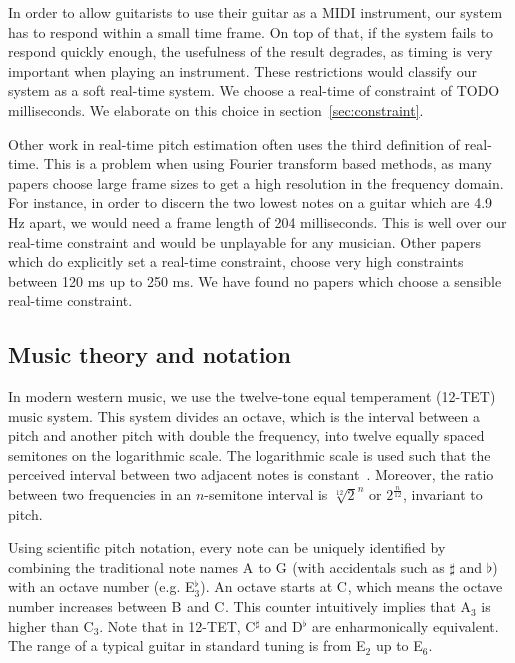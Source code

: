 \documentclass[10pt,twocolumn]{article}
\newcommand{\note}[2]{#1${}_{#2}$}
\newcommand{\notesharp}[2]{#1${}_{#2}^{\sharp}$}
\newcommand{\noteflat}[2]{#1${}_{#2}^{\flat}$}
\begin{document}
In order to allow guitarists to use their guitar as a MIDI instrument, our system has to respond within a small time frame. On top of that, if the system fails to respond quickly enough, the usefulness of the result degrades, as timing is very important when playing an instrument. These restrictions would classify our system as a soft real-time system. We choose a real-time of constraint of TODO milliseconds. We elaborate on this choice in section~\ref{sec:constraint}.

Other work in real-time pitch estimation often uses the third definition of real-time. This is a problem when using Fourier transform based methods, as many papers choose large frame sizes to get a high resolution in the frequency domain. For instance, in order to discern the two lowest notes on a guitar which are 4.9 Hz apart, we would need a frame length of 204 milliseconds. This is well over our real-time constraint and would be unplayable for any musician. Other papers which do explicitly set a real-time constraint, choose very high constraints between 120 ms up to 250 ms. We have found no papers which choose a sensible real-time constraint.

\subsection{Music theory and notation}
In modern western music, we use the twelve-tone equal temperament (12-TET) music system. This system divides an octave, which is the interval between a pitch and another pitch with double the frequency, into twelve equally spaced semitones on the logarithmic scale. The logarithmic scale is used such that the perceived interval between two adjacent notes is constant~\cite{perception}. Moreover, the ratio between two frequencies in an $n$-semitone interval is $\sqrt[12]{2}^n$ or $2^{\frac{n}{12}}$, invariant to pitch.

Using scientific pitch notation, every note can be uniquely identified by combining the traditional note names \note{A}{} to \note{G}{} (with accidentals such as $\sharp$ and $\flat$) with an octave number (e.g. \noteflat{E}{3}). An octave starts at \note{C}{}, which means the octave number increases between \note{B}{} and \note{C}{}. This counter intuitively implies that \note{A}{3} is higher than \note{C}{3}. Note that in 12-TET, \notesharp{C}{} and \noteflat{D}{} are enharmonically equivalent. %
The range of a typical guitar in standard tuning is from \note{E}{2} up to \note{E}{6}.
\end{document}
